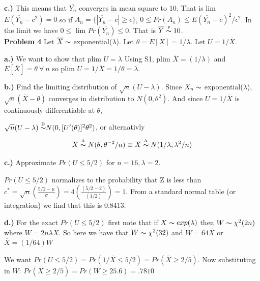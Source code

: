 \documentclass[11pt]{article}
\begin{document}
\textbf{c.)} This means that $\overline{Y_{n}}$ converges in mean square to $10$.  That is lim $E(\overline{Y_{n}} - c^{2}) = 0$ so if $A_{n} = \{|\overline{Y_{n}} - c| \ge \epsilon \}$, $0 \leq Pr(A_{n}) \leq E(\overline{Y_{n}} - c)^{2}/\epsilon^{2}$.  In the limit we have $0 \leq$ lim $ Pr(\overline{Y_{n}}) \leq 0$.  That is $\overline{Y} \thicksim\!\!\!\!\!^{{}^{p}} \ 10$.\\

\textbf{Problem 4} Let $\overline{X} \thicksim$ exponential($\lambda$). Let $\theta = E[X] = 1/\lambda$.  Let $U = 1/\overline{X}$.

\textbf{a.)} We want to show that plim $U = \lambda$  Using S1,
plim $\overline{X} = (1/\lambda)$ and $E[\overline{X}] = \theta \ \forall \ n$ so plim $U = 1/\overline{X} = 1/\theta = \lambda$.

\textbf{b.)} Find the limiting distribution of $\sqrt{n}(U - \lambda)$.
Since $X_{n} \thicksim$ exponential($\lambda$), $\sqrt{n}(\overline{X} - \theta)$ converges in distribution to $N(0, \theta^{2})$.  And since $U = 1/\overline{X}$ is continuously differentiable at $\theta$,

$\sqrt{n}(U - \lambda) \thicksim\!\!\!\!\!\!\!^{{}^{\textrm{ D}}} N(0, [U'(\theta)]^{2}\theta^{2})$, or alternativly

\[
\overline{X} \thicksim\!\!\!\!\!\!\!^{{}^{\textrm{ A}}}\  N(\theta, \theta^{-2}/n) \equiv \overline{X} \thicksim\!\!\!\!\!\!\!^{{}^{\textrm{ A}}}\ N(1/\lambda, \lambda^{2}/n)
\] 

\textbf{c.)} Approximate $Pr(U \leq 5/2)$ for $n = 16, \lambda = 2$.

$Pr(U \leq 5/2)$ normalizes to the probability that Z is less than $c^{*} = \sqrt{n}(\frac{5/2 - \mu}{\sigma}) = 4(\frac{(5/2 - 2)}{(1/2)}) = 1$.  From a standard normal table (or integration) we find that this is 0.8413.

\textbf{d.)}  For the exact $Pr(U \leq 5/2)$ first note that if $X \thicksim exp(\lambda)$ then $W \thicksim \chi^{2}(2n)$ where $W = 2n\lambda \overline{X}$.  So here we have that $W \thicksim \chi^{2}(32)$ and $W = 64\overline{X}$ or $\overline{X} = (1/64)W$

We want $Pr(U \leq 5/2) = Pr(1/ \overline{X} \leq 5/2) = Pr(\overline{X} \geq 2/5).$  Now substituting in $W$: $Pr(\overline{X} \geq 2/5) = Pr(W \geq 25.6) = .7810$\\
\end{document}
